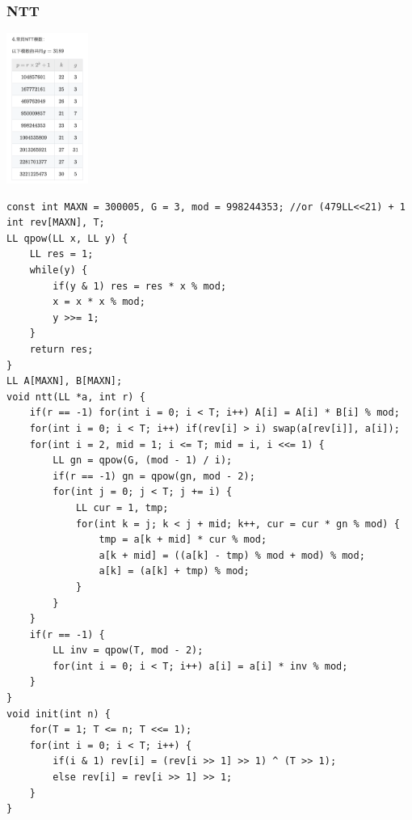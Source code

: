 \documentclass[10pt]{ctexart}
\begin{document}
{\subsubsection{NTT}
\includegraphics[width=0.2\textwidth]{./NTT.png}\par
\begin{lstlisting}
const int MAXN = 300005, G = 3, mod = 998244353; //or (479LL<<21) + 1
int rev[MAXN], T;
LL qpow(LL x, LL y) {
    LL res = 1;
    while(y) {
        if(y & 1) res = res * x % mod;
        x = x * x % mod;
        y >>= 1;
    }
    return res;
}
LL A[MAXN], B[MAXN];
void ntt(LL *a, int r) {
    if(r == -1) for(int i = 0; i < T; i++) A[i] = A[i] * B[i] % mod;
    for(int i = 0; i < T; i++) if(rev[i] > i) swap(a[rev[i]], a[i]);
    for(int i = 2, mid = 1; i <= T; mid = i, i <<= 1) {
        LL gn = qpow(G, (mod - 1) / i);
        if(r == -1) gn = qpow(gn, mod - 2);
        for(int j = 0; j < T; j += i) {
            LL cur = 1, tmp;
            for(int k = j; k < j + mid; k++, cur = cur * gn % mod) {
                tmp = a[k + mid] * cur % mod;
                a[k + mid] = ((a[k] - tmp) % mod + mod) % mod;
                a[k] = (a[k] + tmp) % mod;
            }
        }
    }
    if(r == -1) {
        LL inv = qpow(T, mod - 2);
        for(int i = 0; i < T; i++) a[i] = a[i] * inv % mod;
    }
}
void init(int n) {
    for(T = 1; T <= n; T <<= 1);
    for(int i = 0; i < T; i++) {
        if(i & 1) rev[i] = (rev[i >> 1] >> 1) ^ (T >> 1);
        else rev[i] = rev[i >> 1] >> 1;
    }
}
\end{lstlisting}
}
\end{document}
